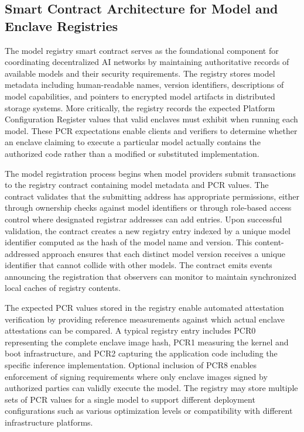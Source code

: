 \subsection{Smart Contract Architecture for Model and Enclave Registries}

The model registry smart contract serves as the foundational component for coordinating decentralized AI networks by maintaining authoritative records of available models and their security requirements. The registry stores model metadata including human-readable names, version identifiers, descriptions of model capabilities, and pointers to encrypted model artifacts in distributed storage systems. More critically, the registry records the expected Platform Configuration Register values that valid enclaves must exhibit when running each model. These PCR expectations enable clients and verifiers to determine whether an enclave claiming to execute a particular model actually contains the authorized code rather than a modified or substituted implementation.

The model registration process begins when model providers submit transactions to the registry contract containing model metadata and PCR values. The contract validates that the submitting address has appropriate permissions, either through ownership checks against model identifiers or through role-based access control where designated registrar addresses can add entries. Upon successful validation, the contract creates a new registry entry indexed by a unique model identifier computed as the hash of the model name and version. This content-addressed approach ensures that each distinct model version receives a unique identifier that cannot collide with other models. The contract emits events announcing the registration that observers can monitor to maintain synchronized local caches of registry contents.

The expected PCR values stored in the registry enable automated attestation verification by providing reference measurements against which actual enclave attestations can be compared. A typical registry entry includes PCR0 representing the complete enclave image hash, PCR1 measuring the kernel and boot infrastructure, and PCR2 capturing the application code including the specific inference implementation. Optional inclusion of PCR8 enables enforcement of signing requirements where only enclave images signed by authorized parties can validly execute the model. The registry may store multiple sets of PCR values for a single model to support different deployment configurations such as various optimization levels or compatibility with different infrastructure platforms.

